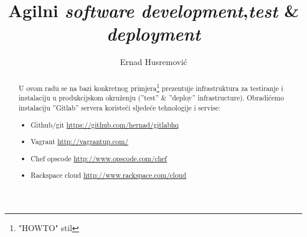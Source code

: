 \documentclass[times, utf8, seminar]{fit}
\begin{document}


\title{Agilni \emph{software development},\newline \emph{test} \& \emph{deployment}}

\author{Ernad Husremović}


\maketitle

\tableofcontents

\newpage

\begin{abstract}

U ovom radu se na bazi konkretnog primjera\footnote{"HOWTO" stil} prezentuje infrastruktura za testiranje i instalaciju u produkcijskom okruženju (''test'' \& ''deploy'' infrastructure). Obradićemo instalaciju ''Gitlab'' servera koristeći sljedeće tehnologije i servise:
\begin{itemize}
  \item Github/git \url{https://github.com/hernad/gitlabhq}
  \item Vagrant  \url{http://vagrantup.com/}
  \item Chef opscode \url{http://www.opscode.com/chef}
  \item Rackspace cloud \url{http://www.rackspace.com/cloud}
\end{itemize}

\end{abstract}

\end{document}
